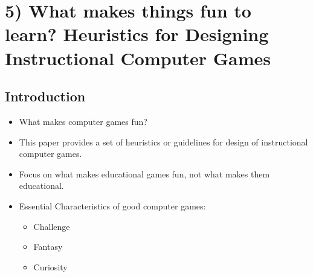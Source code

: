\chapter*{5) What makes things fun to learn? Heuristics for Designing Instructional Computer Games}

  \section*{Introduction}
  \begin{itemize}
    \item What makes computer games fun?
    \item This paper provides a set of heuristics or guidelines for design of instructional computer games.
    \item Focus on what makes educational games fun, not what makes them educational.
    \item Essential Characteristics of good computer games:
        \begin{itemize}
            \item Challenge
            \item Fantasy
            \item Curiosity 
        \end{itemize} 
  \end{itemize}

  \clearpage
